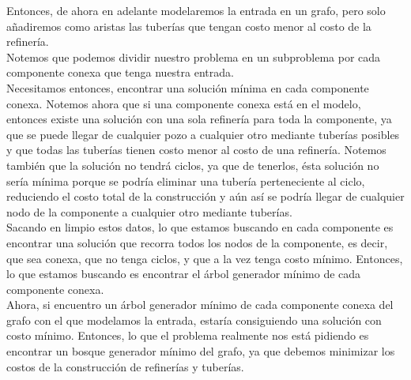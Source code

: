 Entonces, de ahora en adelante modelaremos la entrada en un grafo, pero solo añadiremos como aristas las tuberías que tengan costo menor al costo de la refinería. \\

Notemos que podemos dividir nuestro problema en un subproblema por cada componente conexa que tenga nuestra entrada. \\

Necesitamos entonces, encontrar una solución mínima en cada componente conexa. Notemos ahora que si una componente conexa está en el modelo, entonces existe una solución con una sola refinería para toda la componente, ya que se puede llegar de cualquier pozo a cualquier otro mediante tuberías posibles y que todas las tuberías tienen costo menor al costo de una refinería. Notemos también que la solución no tendrá ciclos, ya que de tenerlos, ésta solución no sería mínima porque se podría eliminar una tubería perteneciente al ciclo, reduciendo el costo total de la construcción y aún así se podría llegar de cualquier nodo de la componente a cualquier otro mediante tuberías. \\

Sacando en limpio estos datos, lo que estamos buscando en cada componente es encontrar una solución que recorra todos los nodos de la componente, es decir, que sea conexa, que no tenga ciclos, y que a la vez tenga costo mínimo. Entonces, lo que estamos buscando es encontrar el árbol generador mínimo de cada componente conexa. \\

Ahora, si encuentro un árbol generador mínimo de cada componente conexa del grafo con el que modelamos la entrada, estaría consiguiendo una solución con costo mínimo. Entonces, lo que el problema realmente nos está pidiendo es encontrar un bosque generador mínimo del grafo, ya que debemos minimizar los costos de la construcción de refinerías y tuberías. \\

